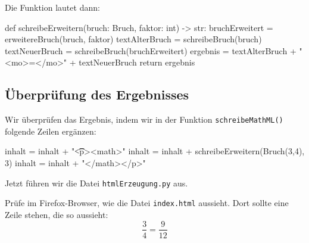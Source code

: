 Die Funktion lautet dann:
\begin{codePython}
def schreibeErweitern(bruch: Bruch, faktor: int) -> str:
	bruchErweitert = erweitereBruch(bruch, faktor)
	textAlterBruch = schreibeBruch(bruch)
	textNeuerBruch = schreibeBruch(bruchErweitert)
	ergebnis = textAlterBruch + "<mo>=</mo>" + textNeuerBruch
	return ergebnis
\end{codePython}

\subsection{Überprüfung des Ergebnisses}

Wir überprüfen das Ergebnis, indem wir in der Funktion \texttt{schreibeMathML()} folgende Zeilen ergänzen:

\begin{codePython}
inhalt = inhalt + "\n\t\t<p><math>"
inhalt = inhalt + schreibeErweitern(Bruch(3,4), 3)
inhalt = inhalt + "</math></p>"
\end{codePython}

Jetzt führen wir die Datei \texttt{htmlErzeugung.py} aus.

Prüfe im Firefox-Browser, wie die Datei \texttt{index.html} aussieht. Dort sollte eine Zeile stehen, die so aussieht:
\[
\frac{3}{4} = \frac{9}{12}
\]